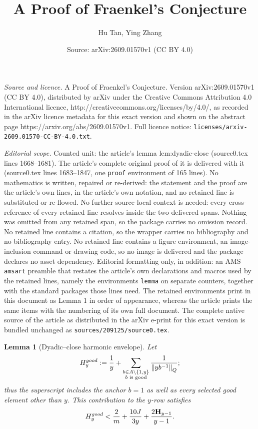 \documentclass[10pt,a4paper]{amsart}
\title{A Proof of Fraenkel's Conjecture}
\author{Hu Tan, Ying Zhang}
\date{Source: arXiv:2609.01570v1 (CC BY 4.0)}
\newtheorem{lemma}{Lemma}
\newcommand{\Harm}{\mathbf H}
\newcommand{\normQ}[1]{\left\lVert #1\right\rVert_Q}
\begin{document}
\maketitle

\noindent\emph{Source and licence.} A Proof of Fraenkel's Conjecture. Version arXiv:2609.01570v1 (CC BY 4.0), distributed by arXiv under the Creative Commons Attribution 4.0 International licence, http://creativecommons.org/licenses/by/4.0/, as recorded in the arXiv licence metadata for this exact version and shown on the abstract page https://arxiv.org/abs/2609.01570v1. Full licence notice: \texttt{licenses/arxiv-2609.01570-CC-BY-4.0.txt}.\par\smallskip

\noindent\textit{Editorial scope.} Counted unit: the article's lemma lem:dyadic-close (source0.tex lines 1668--1681). The article's complete original proof of it is delivered with it (source0.tex lines 1683--1847, one \texttt{proof} environment of 165 lines). No mathematics is written, repaired or re-derived: the statement and the proof are the article's own lines, in the article's own notation, and no retained line is substituted or re-flowed.  No further source-local context is needed: every cross-reference of every retained line resolves inside the two delivered spans.  Nothing was omitted from any retained span, so the package carries no omission record.  No retained line contains a citation, so the wrapper carries no bibliography and no bibliography entry.  No retained line contains a figure environment, an image-inclusion command or drawing code, so no image is delivered and the package declares no asset dependency.  Editorial formatting only, in addition: an AMS \texttt{amsart} preamble that restates the article's own declarations and macros used by the retained lines, namely the environments \texttt{lemma} on separate counters, together with the standard packages those lines need.  The retained environments print in this document as Lemma 1 in order of appearance, whereas the article prints the same items with the numbering of its own full document.  The complete native source of the article as distributed in the arXiv e-print for this exact version is bundled unchanged as \texttt{sources/209125/source0.tex}.
\begin{lemma}[Dyadic--close harmonic envelope]\label{lem:dyadic-close}
Let
\[
 H_y^{\rm good}:=\frac1y+
 \sum_{\substack{b\in A\setminus\{1,y\}\\ b\text{ is good}}}
 \frac1{\normQ{yb^{-1}}};
\]
thus the superscript includes the anchor \(b=1\) as well as every selected
good element other than \(y\).  This contribution to the \(y\)-row satisfies
\begin{equation}\label{eq:dyadic-close}
 H_y^{\rm good}
 <\frac2m+\frac{10J}{3y}+\frac{2\Harm_{y-1}}{y-1}.
\end{equation}
\end{lemma}
\end{document}
